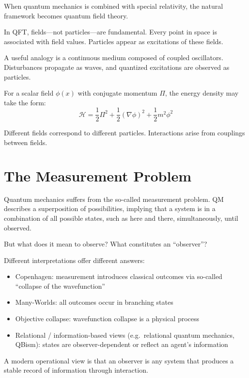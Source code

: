 When quantum mechanics is combined with special relativity, the natural framework becomes quantum field theory.

In QFT, fields---not particles---are fundamental. Every point in space is associated with field values. Particles appear as excitations of these fields.

A useful analogy is a continuous medium composed of coupled oscillators. Disturbances propagate as waves, and quantized excitations are observed as particles.

For a scalar field $\phi(x)$ with conjugate momentum $\Pi$, the energy density may take the form:
\[
\mathcal{H} = \frac{1}{2} \Pi^2 + \frac{1}{2} (\nabla \phi)^2 + \frac{1}{2} m^2 \phi^2
\]

Different fields correspond to different particles. Interactions arise from couplings between fields.


\section*{The Measurement Problem}

Quantum mechanics suffers from the so-called measurement problem. 
QM describes a superposition of possibilities, implying that a system is in a combination of all possible states, such as here and there, simultaneously, until observed.

But what does it mean to observe? What constitutes an ``observer''?

Different interpretations offer different answers:

\begin{itemize}
\item Copenhagen: measurement introduces classical outcomes via so-called ``collapse of the wavefunction''
\item Many-Worlds: all outcomes occur in branching states
\item Objective collapse: wavefunction collapse is a physical process
\item Relational / information-based views (e.g.\ relational quantum mechanics, QBism): states are observer-dependent or reflect an agent's information
\end{itemize}

A modern operational view is that an observer is any system that produces a stable record of information through interaction.



